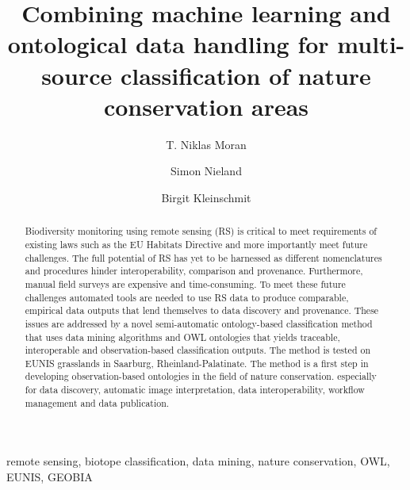\documentclass[authoryear,review,12pt,number]{elsarticle}
\begin{document}
%
\begin{frontmatter}
\title{Combining machine learning and ontological data handling for multi-source
classification of nature conservation areas}

\author[TUB]{T. Niklas Moran}

\author[TUB]{Simon Nieland}
\author[TUB]{Birgit Kleinschmit}

\address[TUB]{Geoinformation in Environmental Planning Lab, Technische
Universit\"at Berlin, Stra\ss e des 17. Juni 145, 10623 Berlin, Germany}


\begin{abstract}
Biodiversity monitoring using remote sensing (RS) is critical to meet 
requirements of existing laws such as the EU Habitats Directive and more 
importantly meet future challenges. The full potential of RS has yet to be 
harnessed as different nomenclatures and procedures hinder interoperability, 
comparison and provenance. Furthermore, manual field surveys are expensive 
and time-consuming. To meet these future challenges automated tools are needed 
to use RS data to produce comparable, empirical data outputs that lend 
themselves to data discovery and provenance. These issues are addressed by a 
novel semi-automatic ontology-based classification method that uses data mining 
algorithms and OWL ontologies that yields traceable, interoperable and 
observation-based classification outputs. The method is tested on EUNIS 
grasslands in Saarburg, Rheinland-Palatinate. The method is a first step in 
developing observation-based ontologies in the field of nature conservation. 
especially for data discovery, automatic image interpretation, data 
interoperability, workflow management and data publication.
\end{abstract}

\begin{keyword}
remote sensing, biotope classification, data mining, nature conservation, OWL, 
EUNIS, GEOBIA 
\end{keyword}
\end{frontmatter}
\end{document}
